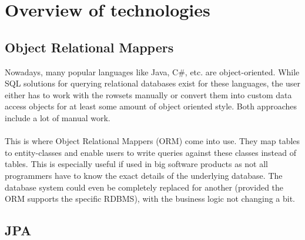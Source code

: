 \section{Overview of technologies}\label{Overview}

\subsection{Object Relational Mappers}
Nowadays, many popular languages like Java, C\#, etc. are object-oriented.
While SQL solutions for querying relational databases exist for these languages, the user either has to work with the rowsets manually or convert them into custom data access objects for at least some amount of object oriented style. Both approaches include a lot of manual work.
\\\\
This is where Object Relational Mappers (ORM) come into use. They map tables to entity-classes and
enable users to write queries against these classes instead of tables. This is especially useful if used
in big software products as not all programmers have to know the exact details of the underlying database. The database system could even be completely replaced for another (provided the ORM supports the specific RDBMS), with the business logic not changing a bit.

\subsection{JPA}

